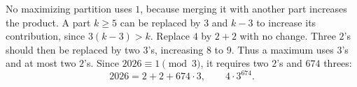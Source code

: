 No maximizing partition uses $1$, because merging it with another part increases the product. A part $k\ge5$ can be replaced by $3$ and $k-3$ to increase its contribution, since $3(k-3)>k$. Replace $4$ by $2+2$ with no change. Three $2$'s should then be replaced by two $3$'s, increasing $8$ to $9$.
Thus a maximum uses $3$'s and at most two $2$'s. Since $2026\equiv1\pmod3$, it requires two $2$'s and $674$ threes:
\[
2026=2+2+674\cdot3,\qquad \boxed{4\cdot3^{674}}.
\]
